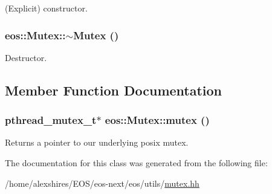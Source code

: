 (Explicit) constructor. \hypertarget{classeos_1_1Mutex_ab721ec095c12b464fd178bb2fc80496a}{
\subsubsection[{$\sim$Mutex}]{\setlength{\rightskip}{0pt plus 5cm}eos::Mutex::$\sim$Mutex ()}}
\label{classeos_1_1Mutex_ab721ec095c12b464fd178bb2fc80496a}


Destructor. 

\subsection{Member Function Documentation}
\hypertarget{classeos_1_1Mutex_a7f5648012d5eb8577a0e4c1b62a0ea38}{
\subsubsection[{mutex}]{\setlength{\rightskip}{0pt plus 5cm}pthread\_\-mutex\_\-t$\ast$ eos::Mutex::mutex ()}}
\label{classeos_1_1Mutex_a7f5648012d5eb8577a0e4c1b62a0ea38}


Returns a pointer to our underlying posix mutex. 

The documentation for this class was generated from the following file:\begin{DoxyCompactItemize}
\item 
/home/alexshires/EOS/eos-\/next/eos/utils/\hyperlink{mutex_8hh}{mutex.hh}\end{DoxyCompactItemize}
